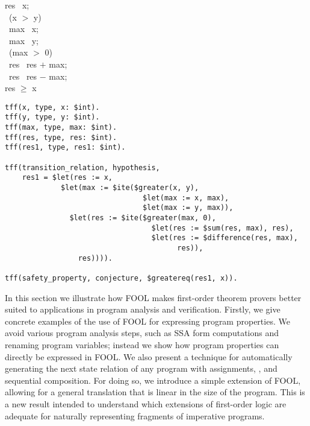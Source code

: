 \begin{figure*}[b]
  \vspace{-1em}
  \begin{center}
    \parbox{0cm}{
      \begin{tabbing}
        res \ass\ x;\\
        \IF\ (x $>$ y) \\\inc
        \THEN\ max \ass\ x;\\
        \ELSE\ max \ass\ y;\\\dec
        \IF\ (max $>$ 0) \\\inc
        \THEN\ res \ass\ res $+$ max;\\
        \ELSE\ res \ass\ res $-$ max;\\[.5em]\dec
         res $\geq$ x
      \end{tabbing}
    }
  \end{center}
  \vspace{-2em}
  \caption{Sequence of conditionals.\label{fig:seqITE}}
\end{figure*}

\begin{figure*}[tb]
{\small
\vspace{-1em}
\begin{lstlisting}
tff(x, type, x: $int).
tff(y, type, y: $int).
tff(max, type, max: $int).
tff(res, type, res: $int).
tff(res1, type, res1: $int).

tff(transition_relation, hypothesis,
    res1 = $let(res := x,
             $let(max := $ite($greater(x, y),
                                $let(max := x, max),
                                $let(max := y, max)),
               $let(res := $ite($greater(max, 0),
                                  $let(res := $sum(res, max), res),
                                  $let(res := $difference(res, max),
                                        res)),
                 res)))).

tff(safety_property, conjecture, $greatereq(res1, x)).
\end{lstlisting}
\caption{Representation of the partial correctness statement of the code on Figure~\ref{fig:seqITE} in Vampire\label{fig:VampireITE}.}
}
\end{figure*}

In this section we illustrate how FOOL makes first-order theorem
provers better suited to applications in program analysis and
verification.
Firstly,  we give concrete examples of the use of FOOL for
expressing program properties. We avoid various
program analysis steps, such as SSA form computations and renaming
program variables; instead we show how program properties can directly
be expressed in FOOL.
 We also present a technique for
automatically generating the next state relation of any program with
assignments, \ITE, and sequential composition.
For doing so,  we introduce a simple extension of FOOL,
allowing for a general translation that is linear in the size of the
program.
This is a new result intended to understand which extensions of
first-order logic are adequate for naturally representing fragments of
imperative programs.

